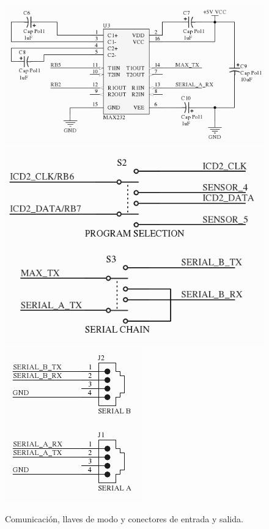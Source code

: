 \begin{figure}
	\centering
	\includegraphics[scale=.28]{figuras/sense_schemaComm1.png}
	\includegraphics[scale=.2]{figuras/sense_schemaComm2.png}
	\includegraphics[scale=.28]{figuras/sense_schemaComm3.png}
	\caption{Comunicaci\'on, llaves de modo y conectores de entrada y salida.}
	\label{hF_placa_sense_schema2}
\end{figure}

